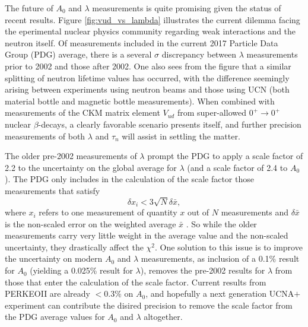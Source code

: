 The future of $A_0$ and $\lambda$ measurements is quite promising given the status of recent results. Figure
\ref{fig:vud_vs_lambda} illustrates the current dilemma facing the eperimental nuclear physics community regarding
weak interactions and the neutron itself.
Of measurements included in the current 2017 Particle Data Group (PDG) average, 
there is a several $\sigma$ discrepancy between $\lambda$ measurements prior to 2002 and those
after 2002. One also sees from the figure that a similar splitting of neutron lifetime values has occurred,
with the difference seemingly arising between experiments using neutron beams \cite{yue2013,byrne1996}
and those using UCN (both
material bottle \cite{serebrov2005,arzumanov2015,steyerl2012,pichlmaier2010,mampe1993}
and magnetic bottle \cite{pattie2017} measurements). When combined with measurements of the CKM
matrix element $V_{ud}$ from super-allowed $0^+\rightarrow 0^+$ nuclear $\beta$-decays, a clearly favorable
scenario presents itself, and further precision measurements of both $\lambda$ and $\tau_n$ will assist
in settling the matter.

The older pre-2002 measurements of $\lambda$ prompt the PDG to apply a scale factor of 2.2 to the uncertainty
on the global average for $\lambda$ (and a scale factor of 2.4 to $A_0$).
The PDG only includes in
the calculation of the scale factor those measurements that satisfy
\begin{equation}
  \delta x_i < 3 \sqrt{N} \delta \bar{x},
\end{equation}
\noindent where $x_i$ refers to one measurement of quantity $x$ out of $N$ measurements and
$\delta \bar{x}$ is the non-scaled error on the weighted average $\bar{x}$ \cite{pdg}. So while
the older measurements carry very little weight in the average value and the non-scaled uncertainty,
they drastically affect the $\chi^2$. One solution to this issue is to improve the uncertainty on
modern $A_0$ and $\lambda$ measurements, as inclusion of a 0.1\% result for $A_0$ (yielding a 0.025\% result for
$\lambda$), removes the pre-2002 results for $\lambda$
from those that enter the calculation of the
scale factor. Current results from PERKEOII are already $<0.3\%$ on $A_0$, and hopefully a next generation
UCNA$+$ experiment can contribute the disired precision to remove the scale factor from the PDG average values
for $A_0$ and $\lambda$ altogether.















